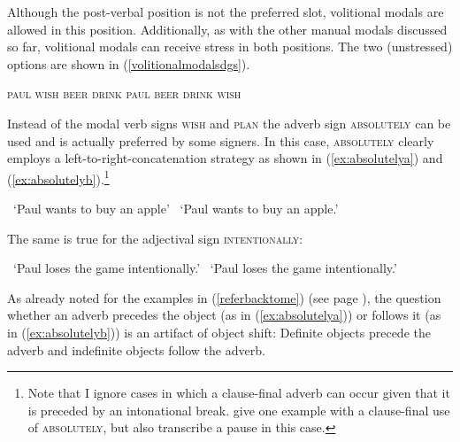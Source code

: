 Although the post-verbal position is not the preferred slot, volitional modals are allowed in this position. Additionally, as with the other manual modals discussed so far, volitional modals can receive stress in both positions. The two (unstressed) options are shown in (\ref{volitionalmodalsdgs}).

\begin{exe}
\ex\label{volitionalmodalsdgs}\begin{xlist}
\ex \textsc{paul wish beer drink} 
\ex \textsc{paul beer drink wish} 
\end{xlist}
\end{exe}

\noindent Instead of the modal verb signs \textsc{wish} and \textsc{plan} the adverb sign \textsc{absolutely} can be used and is actually preferred by some signers. In this case, \textsc{absolutely} clearly employs a left-to-right-concatenation strategy as shown in (\ref{ex:absolutelya}) and (\ref{ex:absolutelyb}).\footnote{ Note that I ignore cases in which a clause-final adverb can occur given that it is preceded by an intonational break. \citet[283]{happ2014vork} give one example with a clause-final use of \textsc{absolutely}, but also transcribe a pause in this case. } 

\begin{exe}
\ex\begin{xlist} 
\glt \textcolor{white}{*}`Paul wants to buy an apple' \label{ex:absolutelya}
\glt \textcolor{white}{*}`Paul wants to buy an apple.'  \label{ex:absolutelyb}
\end{xlist}
\end{exe} 

\noindent The same is true for the adjectival sign \textsc{intentionally}:

\begin{exe}
\ex\begin{xlist} 
\glt \textcolor{white}{*}`Paul loses the game intentionally.' \label{ex:intentionallya}
\glt \textcolor{white}{*}`Paul loses the game intentionally.'  \label{ex:intentionallyb}
\end{xlist}
\end{exe} 

\noindent As already noted for the examples in (\ref{referbacktome}) (see page \pageref{referbacktome}), the question whether an adverb precedes the object (as in (\ref{ex:absolutelya})) or follows it (as in (\ref{ex:absolutelyb})) is an artifact of object shift: Definite objects precede the adverb and indefinite objects follow the adverb. 

